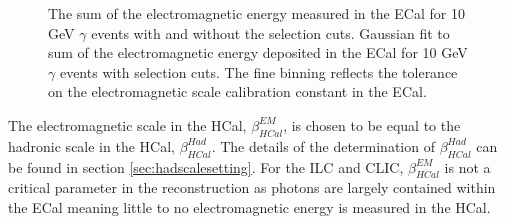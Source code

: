 \begin{figure}[h!]
\caption[\protect{} The sum of the electromagnetic energy measured in the ECal for 10 GeV $\gamma$ events with and without the selection cuts.  \protect{} Gaussian fit to sum of the electromagnetic energy deposited in the ECal for 10 GeV $\gamma$ events with selection cuts.  The fine binning reflects the tolerance on the electromagnetic scale calibration constant in the ECal.]{\protect{} The sum of the electromagnetic energy measured in the ECal for 10 GeV $\gamma$ events with and without the selection cuts.  \protect{} Gaussian fit to sum of the electromagnetic energy deposited in the ECal for 10 GeV $\gamma$ events with selection cuts.  The fine binning reflects the tolerance on the electromagnetic scale calibration constant in the ECal.}
\label{fig:ecalemscale}
\end{figure}
 
The electromagnetic scale in the HCal, $\beta^{EM}_{HCal}$, is chosen to be equal to the hadronic scale in the HCal, $\beta^{Had}_{HCal}$.  The details of the determination of $\beta^{Had}_{HCal}$ can be found in section \ref{sec:hadscalesetting}.  For the ILC and CLIC, $\beta^{EM}_{HCal}$ is not a critical parameter in the reconstruction as photons are largely contained within the ECal meaning little to no electromagnetic energy is measured in the HCal.  

